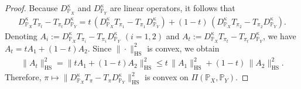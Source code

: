 \documentclass{article}
\begin{document}
\begin{proof}
	Because $D_{\mathbb{P}_X}^{\kappa}$ and $D_{\mathbb{P}_Y}^{\kappa}$ are linear operators, it follows that
	\begin{align*}
	D_{\mathbb{P}_X}^{\kappa}T_{\pi_t} - T_{\pi_t}D_{\mathbb{P}_Y}^{\kappa}
	= t\,(D_{\mathbb{P}_X}^{\kappa}T_{\pi_1} - T_{\pi_1}D_{\mathbb{P}_Y}^{\kappa})
	+ (1-t)\,(D_{\mathbb{P}_X}^{\kappa}T_{\pi_2} - T_{\pi_2}D_{\mathbb{P}_Y}^{\kappa}).
	\end{align*}
	Denoting $A_i := D_{\mathbb{P}_X}^{\kappa}T_{\pi_i} - T_{\pi_i}D_{\mathbb{P}_Y}^{\kappa}$ $(i=1,2)$ and $A_t := D_{\mathbb{P}_X}^{\kappa}T_{\pi_t} - T_{\pi_t}D_{\mathbb{P}_Y}^{\kappa}$, 
	we have $A_t = tA_1 + (1-t)A_2$. 
	Since $\|\cdot\|_{\mathrm{HS}}^2$ is convex, we obtain
	\begin{align*}
	\|A_t\|_{\mathrm{HS}}^2
	= \|tA_1 + (1-t)A_2\|_{\mathrm{HS}}^2
	\le t\,\|A_1\|_{\mathrm{HS}}^2 + (1-t)\,\|A_2\|_{\mathrm{HS}}^2.
	\end{align*}
	Therefore, $\pi \mapsto \|D_{\mathbb{P}_X}^{\kappa}T_\pi - T_\pi D_{\mathbb{P}_Y}^{\kappa}\|_{\mathrm{HS}}^2$ is convex on $\Pi(\mathbb{P}_X,\mathbb{P}_Y)$. 
\end{proof}
\end{document}
